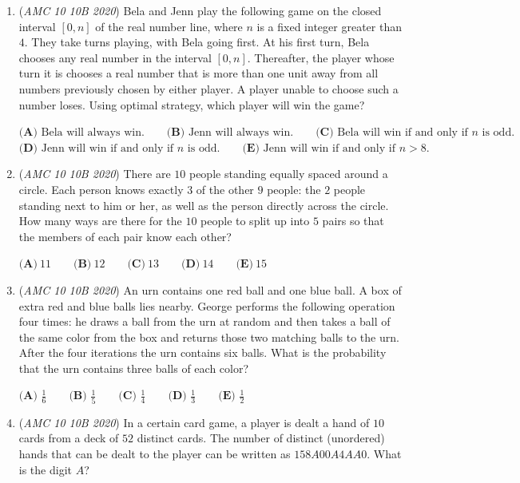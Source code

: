 \begin{enumerate}
 $\textbf{(A)}\ 7 \qquad\textbf{(B)}\ 9 \qquad\textbf{(C)}\ 10 \qquad\textbf{(D)}\ 11 \qquad\textbf{(E)}\ 12$


	\item (\textit{AMC 10 10B 2020}) Bela and Jenn play the following game on the closed interval $[0, n]$ of the real number line, where $n$ is a fixed integer greater than $4$. They take turns playing, with Bela going first. At his first turn, Bela chooses any real number in the interval $[0, n]$. Thereafter, the player whose turn it is chooses a real number that is more than one unit away from all numbers previously chosen by either player. A player unable to choose such a number loses. Using optimal strategy, which player will win the game?


 $\textbf{(A)} \text{ Bela will always win.} \qquad \textbf{(B)} \text{ Jenn will always win.} \qquad \textbf{(C)} \text{ Bela will win if and only if }n \text{ is odd.}$
$\textbf{(D)} \text{ Jenn will win if and only if }n \text{ is odd.} \qquad \textbf{(E)} \text { Jenn will win if and only if } n>8.$


	\item (\textit{AMC 10 10B 2020}) There are $10$ people standing equally spaced around a circle. Each person knows exactly $3$ of the other $9$ people: the $2$ people standing next to him or her, as well as the person directly across the circle. How many ways are there for the $10$ people to split up into $5$ pairs so that the members of each pair know each other?


 $\textbf{(A)}\ 11 \qquad\textbf{(B)}\ 12 \qquad\textbf{(C)}\  13 \qquad\textbf{(D)}\ 14 \qquad\textbf{(E)}\ 15$


	\item (\textit{AMC 10 10B 2020}) An urn contains one red ball and one blue ball. A box of extra red and blue balls lies nearby. George performs the following operation four times: he draws a ball from the urn at random and then takes a ball of the same color from the box and returns those two matching balls to the urn. After the four iterations the urn contains six balls. What is the probability that the urn contains three balls of each color?


 $\textbf{(A) } \frac16 \qquad \textbf{(B) }\frac15 \qquad \textbf{(C) } \frac14 \qquad \textbf{(D) } \frac13 \qquad \textbf{(E) } \frac12$


	\item (\textit{AMC 10 10B 2020}) In a certain card game, a player is dealt a hand of $10$ cards from a deck of $52$ distinct cards. The number of distinct (unordered) hands that can be dealt to the player can be written as $158A00A4AA0$. What is the digit $A$?



\end{enumerate}

